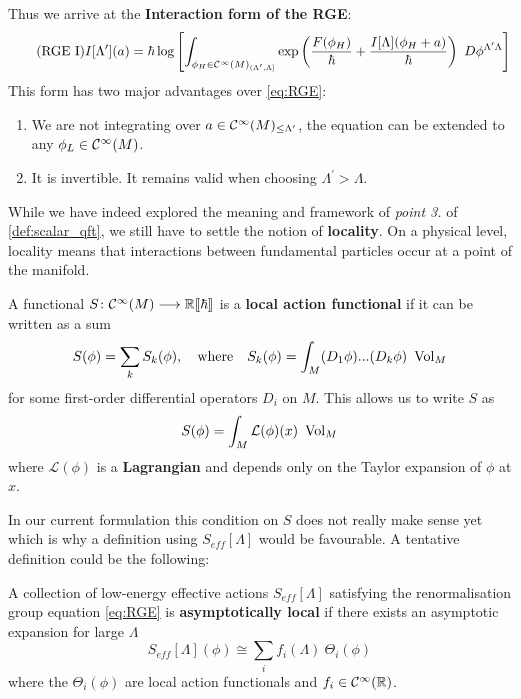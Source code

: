 Thus we arrive at the \textbf{Interaction form of the RGE}:
\begin{align}
\label{eq:RGE_interaction}\tag{RGE I}
  I[\Lambda^\prime](a) = \hbar \log \left[  \int_{\phi_H \in \Ci(M)_{(\Lambda^\prime,\Lambda]}} \exp\left(\frac{F(\phi_H)}{\hbar} + \frac{I[\Lambda](\phi_H + a)}{\hbar} \right) \ D\phi^{\Lambda^\prime \Lambda} \right]
\end{align}
This form has two major advantages over \eqref{eq:RGE}:
\begin{enumerate}
  \item We are not integrating over $a \in \mathcal{C}^{\infty}(M)_{\leq \Lambda^\prime}$, the equation can be extended to any $\phi_L \in \Ci(M)$.

  \item It is invertible. It remains valid when choosing $\Lambda^\prime > \Lambda$.
\end{enumerate}

While we have indeed explored the meaning and framework of \emph{point 3.} of \ref{def:scalar_qft}, we still have to settle the notion of \textbf{locality}. On a physical level, locality means that interactions between fundamental particles occur at a point of the manifold.

\begin{definition}
  A functional $S\colon \mathcal{C}^{\infty}(M) \longrightarrow \mathbb{R} \llbracket \hbar \rrbracket$ is a \textbf{local action functional} if it can be written as a sum
  \begin{equation}S(\phi) = \sum_k S_k (\phi), \quad \text{where} \quad S_k(\phi) = \int_M (D_1 \phi) ... (D_k \phi) \ \vol_M\end{equation}
  for some first-order differential operators $D_i$ on $M$. This allows us to write $S$ as
  \begin{equation}S(\phi) = \int_M \mathcal{L}(\phi)(x) \ \vol_M\end{equation}
  where $\mathcal{L}(\phi)$ is a \textbf{Lagrangian} and depends only on the Taylor expansion of $\phi$ at $x$.
\end{definition}

In our current formulation this condition on $S$ does not really make sense yet which is why a definition using $S_{eff}[\Lambda]$ would be favourable. A tentative definition could be the following:

\begin{definition}
  A collection of low-energy effective actions $S_{eff}[\Lambda]$ satisfying the renormalisation group equation \ref{eq:RGE} is \textbf{asymptotically local} if there exists an asymptotic expansion for large $\Lambda$
  \begin{equation}S_{eff}[\Lambda] (\phi) \cong \sum_i f_i (\Lambda) \ \Theta_i (\phi)\end{equation}
  where the $\Theta_i (\phi)$ are local action functionals and $f_i \in \mathcal{C}^{\infty}(\mathbb{R})$.
\end{definition}

